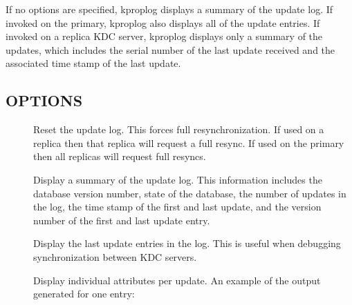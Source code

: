 \documentclass[letterpaper,10pt,english]{sphinxmanual}
\begin{document}
If no options are specified, kproplog displays a summary of the update
log.  If invoked on the primary, kproplog also displays all of the
update entries.  If invoked on a replica KDC server, kproplog displays
only a summary of the updates, which includes the serial number of the
last update received and the associated time stamp of the last update.


\subsection{OPTIONS}
\label{\detokenize{admin/admin_commands/kproplog:options}}\begin{description}
\item[{}] \leavevmode
Reset the update log.  This forces full resynchronization.  If
used on a replica then that replica will request a full resync.
If used on the primary then all replicas will request full
resyncs.

\item[{}] \leavevmode
Display a summary of the update log.  This information includes
the database version number, state of the database, the number of
updates in the log, the time stamp of the first and last update,
and the version number of the first and last update entry.

\item[{ }] \leavevmode
Display the last  update entries in the log.  This is useful
when debugging synchronization between KDC servers.

\item[{}] \leavevmode
Display individual attributes per update.  An example of the
output generated for one entry:

%
\begin{sphinxVerbatim}[commandchars=\\\{\}]
 
     
      
      
      
      
           
      
          
           
          
          
          
\end{sphinxVerbatim}

\end{description}
\end{document}
